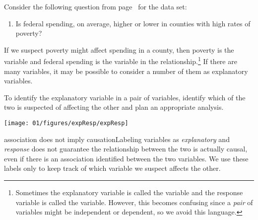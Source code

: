 
Consider the following question from page~\pageref{fedSpendingPovertyQuestion} for the  data set:
\begin{enumerate}
\item[(1)] 
	Is federal spending, on average, higher or lower in counties with high rates of poverty?
\end{enumerate}
If we suspect poverty might affect spending in a county, then poverty is the  variable and federal spending is the  variable in the relationship.\footnote{Sometimes the explanatory variable is called the  variable and the response variable is called the  variable. However, this becomes confusing since a \emph{pair} of variables might be independent or dependent, so we avoid this language.} If there are many variables, it may be possible to consider a number of them as explanatory variables.

\begin{tipBox}{
To identify the explanatory variable in a pair of variables, identify which of the two is suspected of affecting the other and plan an appropriate analysis.

\hspace{10mm}\texttt{[image: 01/figures/expResp/expResp]}}
\end{tipBox}

\begin{caution}{association does not imply causation}{Labeling variables as \emph{explanatory} and \emph{response} does not guarantee the relationship between the two is actually causal, even if there is an association identified between the two variables. We use these labels only to keep track of which variable we suspect affects the other.}
\end{caution}


